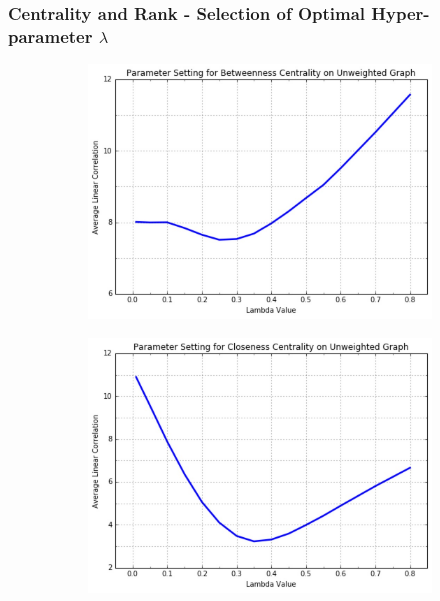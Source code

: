 \documentclass[9pt]{beamer}
\begin{document}
\begin{frame}
\frametitle{Centrality and Rank - Selection of Optimal Hyper-parameter $\lambda$}
\vspace{0.15in}
\begin{figure}[H]
\centering
\begin{subfigure}{.4\textwidth}
  \centering
  \includegraphics[width=0.95\linewidth]{BCU_2.jpeg}
\end{subfigure}
\begin{subfigure}{.4\textwidth}
	\centering
    \includegraphics[width=0.95\linewidth]{CCU_2.jpeg}
\end{subfigure}


\end{figure}
\end{frame}
\end{document}
